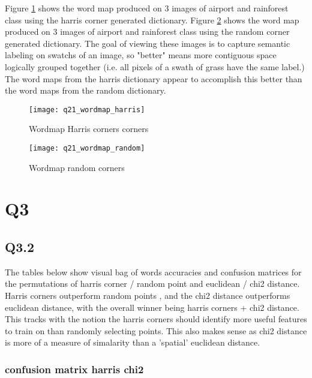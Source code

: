 \documentclass[12pt]{article}
\begin{document}
Figure \ref{fig:wordmapharris} shows the word map produced on 3 images of airport and rainforest class using the harris corner generated dictionary.
Figure \ref{fig:wordmaprandom} shows the word map produced on 3 images of airport and rainforest class using the random corner generated dictionary.
The goal of viewing these images is to capture semantic labeling on swatchs of an image, so "better" means more contiguous space logically grouped together (i.e. all pixels of a swath of grass have the same label.) The word maps from the harris dictionary appear to accomplish this better than the word maps from the random dictionary.

\begin{figure}[H]
\centering
\texttt{[image: q21\_wordmap\_harris]}
\caption{Wordmap Harris corners corners}    
\label{fig:wordmapharris}
\end{figure}   


\begin{figure}[H]
\centering
\texttt{[image: q21\_wordmap\_random]}
\caption{Wordmap random corners}    
\label{fig:wordmaprandom}
\end{figure}   

\newpage
\section{Q3}
\subsection{Q3.2}

The tables below show visual bag of words accuracies and confusion matrices for the permutations of harris corner / random point and euclidean / chi2 distance.  Harris corners outperform random points , and the chi2 distance outperforms euclidean distance, with the overall winner being harris corners + chi2 distance. This tracks with the notion the harris corners should identify more useful features to train on than randomly selecting points. This also makes sense as chi2 distance is more of a measure of simalarity than a 'spatial' euclidean distance.


\subsubsection{confusion matrix harris chi2}
\end{document}
